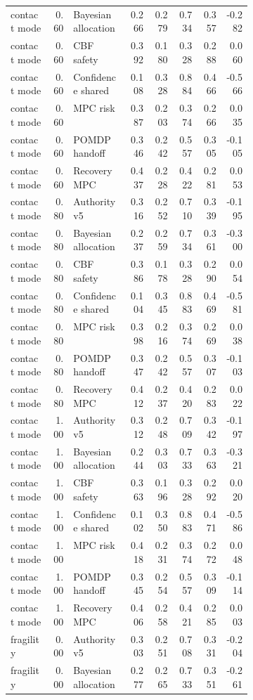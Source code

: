 \documentclass{article}
\begin{document}
\begin{center}
\begin{longtable}{p{0.17\linewidth}rp{0.23\linewidth}rrrrr}
contact mode & 0.60 & Bayesian allocation & 0.266 & 0.279 & 0.734 & 0.357 & -0.282\\
contact mode & 0.60 & CBF safety & 0.392 & 0.180 & 0.328 & 0.288 & 0.060\\
contact mode & 0.60 & Confidence shared & 0.108 & 0.328 & 0.884 & 0.466 & -0.566\\
contact mode & 0.60 & MPC risk & 0.387 & 0.203 & 0.374 & 0.266 & 0.035\\
contact mode & 0.60 & POMDP handoff & 0.346 & 0.242 & 0.557 & 0.305 & -0.105\\
contact mode & 0.60 & Recovery MPC & 0.437 & 0.228 & 0.422 & 0.281 & 0.053\\
contact mode & 0.80 & Authority v5 & 0.316 & 0.252 & 0.710 & 0.339 & -0.195\\
contact mode & 0.80 & Bayesian allocation & 0.237 & 0.259 & 0.734 & 0.361 & -0.300\\
contact mode & 0.80 & CBF safety & 0.386 & 0.178 & 0.328 & 0.290 & 0.054\\
contact mode & 0.80 & Confidence shared & 0.104 & 0.345 & 0.883 & 0.469 & -0.581\\
contact mode & 0.80 & MPC risk & 0.398 & 0.216 & 0.374 & 0.269 & 0.038\\
contact mode & 0.80 & POMDP handoff & 0.347 & 0.242 & 0.557 & 0.307 & -0.103\\
contact mode & 0.80 & Recovery MPC & 0.412 & 0.237 & 0.420 & 0.283 & 0.022\\
contact mode & 1.00 & Authority v5 & 0.312 & 0.248 & 0.709 & 0.342 & -0.197\\
contact mode & 1.00 & Bayesian allocation & 0.244 & 0.303 & 0.733 & 0.363 & -0.321\\
contact mode & 1.00 & CBF safety & 0.363 & 0.196 & 0.328 & 0.292 & 0.020\\
contact mode & 1.00 & Confidence shared & 0.102 & 0.350 & 0.883 & 0.471 & -0.586\\
contact mode & 1.00 & MPC risk & 0.418 & 0.231 & 0.374 & 0.272 & 0.048\\
contact mode & 1.00 & POMDP handoff & 0.345 & 0.254 & 0.557 & 0.309 & -0.114\\
contact mode & 1.00 & Recovery MPC & 0.406 & 0.258 & 0.421 & 0.285 & 0.003\\
fragility & 0.00 & Authority v5 & 0.303 & 0.251 & 0.708 & 0.331 & -0.204\\
fragility & 0.00 & Bayesian allocation & 0.277 & 0.265 & 0.733 & 0.351 & -0.261\\

\end{longtable}
\end{center}
\end{document}
